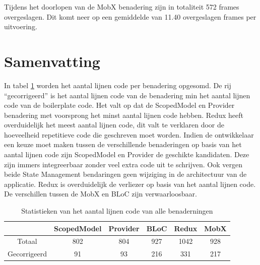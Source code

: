 Tijdens het doorlopen van de MobX benadering zijn in totaliteit 572 frames overgeslagen. Dit komt neer op een gemiddelde van 11.40 overgeslagen frames per uitvoering.

\section{Samenvatting}
In tabel \ref{table:amount-lines-of-code} worden het aantal lijnen code per benadering opgesomd. De rij ``gecorrigeerd'' is het aantal lijnen code van de benadering min het aantal lijnen code van de boilerplate code. Het valt op dat de ScopedModel en Provider benadering met voorsprong het minst aantal lijnen code hebben. Redux heeft overduidelijk het meest aantal lijnen code, dit valt te verklaren door de hoeveelheid repetitieve code die geschreven moet worden. \newline \newline
Indien de ontwikkelaar een keuze moet maken tussen de verschillende benaderingen op basis van het aantal lijnen code zijn ScopedModel en Provider de geschikte kandidaten. Deze zijn immers integreerbaar zonder veel extra code uit te schrijven. Ook vergen beide State Management bendaringen geen wijziging in de architectuur van de applicatie. \newline
Redux is overduidelijk de verliezer op basis van het aantal lijnen code. De verschillen tussen de MobX en BLoC zijn verwaarloosbaar.
\begin{table}[H]
    \centering
    \begin{tabular}{c|c|c|c|c|c}
        & \textbf{ScopedModel} & \textbf{Provider} & \textbf{BLoC} & \textbf{Redux} & \textbf{MobX} \\ \hline
        Totaal               & 802   &  804     &  927     &  1042    &  928        \\ \hline
        Gecorrigeerd         & 91    &  93      &  216     &  331     &  217
    \end{tabular}
    \caption{Statistieken van het aantal lijnen code van alle benaderningen}
    \label{table:amount-lines-of-code}
\end{table}

